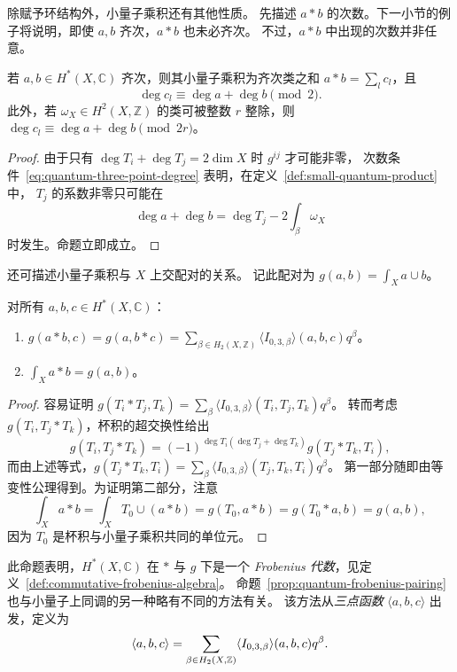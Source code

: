 除赋予环结构外，小量子乘积还有其他性质。
先描述 $a*b$ 的次数。下一小节的例子将说明，即使 $a,b$ 齐次，$a*b$ 也未必齐次。
不过，$a*b$ 中出现的次数并非任意。
\begin{proposition}\label{prop:small-quantum-degree}
若 $a,b\in H^*(X,\mathbb C)$ 齐次，则其小量子乘积为齐次类之和 $a*b=\sum_lc_l$，且
\[
\deg c_l\equiv\deg a+\deg b\pmod2.
\]
此外，若 $\omega_X\in H^2(X,\mathbb Z)$ 的类可被整数 $r$ 整除，则
$\deg c_l\equiv\deg a+\deg b\pmod{2r}$。
\end{proposition}
\begin{proof}
由于只有 $\deg T_i+\deg T_j=2\dim X$ 时 $g^{ij}$ 才可能非零，
次数条件~\eqref{eq:quantum-three-point-degree} 表明，在定义~\ref{def:small-quantum-product} 中，
$T_j$ 的系数非零只可能在
\[
\deg a+\deg b=\deg T_j-2\int_\beta\omega_X
\]
时发生。命题立即成立。
\end{proof}
还可描述小量子乘积与 $X$ 上交配对的关系。
记此配对为 $g(a,b)=\int_Xa\cup b$。
\begin{proposition}\label{prop:quantum-frobenius-pairing}
对所有 $a,b,c\in H^*(X,\mathbb C)$：
\begin{enumerate}[label=(\roman*)]
\item $g(a*b,c)=g(a,b*c)=\sum_{\beta\in H_2(X,\mathbb Z)}\langle I_{0,3,\beta}\rangle(a,b,c)q^\beta$。
\item $\int_Xa*b=g(a,b)$。
\end{enumerate}
\end{proposition}
\begin{proof}
容易证明 $g(T_i*T_j,T_k)=\sum_\beta\langle I_{0,3,\beta}\rangle(T_i,T_j,T_k)q^\beta$。
转而考虑 $g(T_i,T_j*T_k)$，杯积的超交换性给出
\[
g(T_i,T_j*T_k)=(-1)^{\deg T_i(\deg T_j+\deg T_k)}g(T_j*T_k,T_i),
\]
而由上述等式，$g(T_j*T_k,T_i)=\sum_\beta\langle I_{0,3,\beta}\rangle(T_j,T_k,T_i)q^\beta$。
第一部分随即由等变性公理得到。为证明第二部分，注意
\[
\int_Xa*b=\int_XT_0\cup(a*b)=g(T_0,a*b)=g(T_0*a,b)=g(a,b),
\]
因为 $T_0$ 是杯积与小量子乘积共同的单位元。
\end{proof}
此命题表明，$H^*(X,\mathbb C)$ 在 $*$ 与 $g$ 下是一个 \emph{Frobenius 代数}，见定义~\ref{def:commutative-frobenius-algebra}。
命题~\ref{prop:quantum-frobenius-pairing} 也与小量子上同调的另一种略有不同的方法有关。
该方法从\emph{三点函数} $\langle a,b,c\rangle$ 出发，定义为
\begin{equation}\label{eq:a-three-point-function}
\index{三点函数!量子上同调|hyperpage}
\langle a,b,c\rangle=\sum_{\beta\in H_2(X,\mathbb Z)}\langle I_{0,3,\beta}\rangle(a,b,c)q^\beta.
\end{equation}

